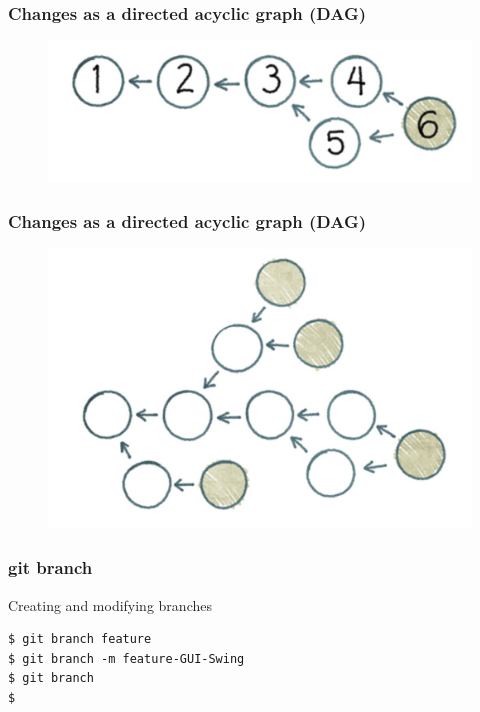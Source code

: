 \documentclass{beamer}
\begin{document}
\begin{frame}
\frametitle{Changes as a directed acyclic graph (DAG)}

\begin{figure}
\includegraphics[scale=0.3]{figures/f11.png}
\end{figure}

\end{frame}


\begin{frame}
\frametitle{Changes as a directed acyclic graph (DAG)}

\begin{figure}
\includegraphics[scale=0.3]{figures/f12.png}
\end{figure}

\end{frame}


\begin{frame}[fragile]
\frametitle{git branch}

Creating and modifying branches

\begin{lstlisting}
$ git branch feature 
$ git branch -m feature-GUI-Swing
$ git branch 
$
\end{lstlisting}
\end{frame}
\end{document}
